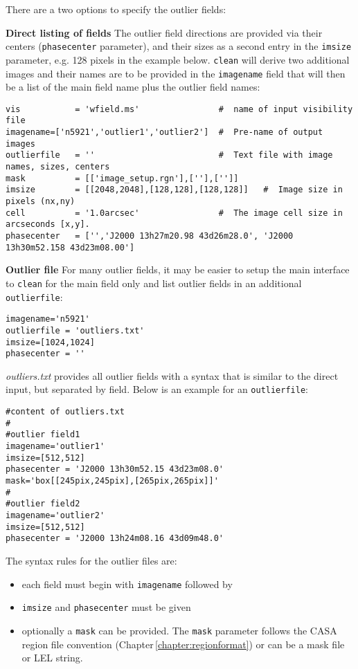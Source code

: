 There are a two options to specify the outlier fields:


{\bf Direct listing of fields} The outlier field directions are
provided via their centers ({\tt phasecenter} parameter), and their
sizes as a second entry in the {\tt imsize} parameter, e.g. 128 pixels
in the example below. {\tt clean} will derive two additional images
and their names are to be provided in the {\tt imagename} field that
will then be a list of the main field name plus the outlier field
names:

\small
\begin{verbatim}
vis           = 'wfield.ms'                #  name of input visibility file
imagename=['n5921','outlier1','outlier2']  #  Pre-name of output images
outlierfile   = ''                         #  Text file with image names, sizes, centers
mask          = [['image_setup.rgn'],[''],['']] 
imsize        = [[2048,2048],[128,128],[128,128]]   #  Image size in pixels (nx,ny)
cell          = '1.0arcsec'                #  The image cell size in arcseconds [x,y].
phasecenter   = ['','J2000 13h27m20.98 43d26m28.0', 'J2000 13h30m52.158 43d23m08.00']
\end{verbatim}
\normalsize

{\bf Outlier file} For many outlier fields, it may be easier to setup
the main interface to {\tt clean} for the main field only and list
outlier fields in an additional {\tt outlierfile}:


\small
\begin{verbatim}
imagename='n5921'
outlierfile = 'outliers.txt'
imsize=[1024,1024]
phasecenter = ''
\end{verbatim}
\normalsize

{\it outliers.txt} provides all outlier fields with a syntax that is
similar to the direct input, but separated by field. Below is an
example for an {\tt outlierfile}:

\small
\begin{verbatim}
#content of outliers.txt
#
#outlier field1
imagename='outlier1'
imsize=[512,512]
phasecenter = 'J2000 13h30m52.15 43d23m08.0'
mask='box[[245pix,245pix],[265pix,265pix]]'
#
#outlier field2
imagename='outlier2'
imsize=[512,512]
phasecenter = 'J2000 13h24m08.16 43d09m48.0'
\end{verbatim}
\normalsize

The syntax rules for the outlier files are:
\begin{itemize}
\item each field must begin with {\tt imagename} followed by 
\item {\tt imsize} and {\tt phasecenter} must be given
\item optionally a {\tt mask} can be provided. The {\tt mask}
  parameter follows the CASA region file convention
  (Chapter\,\ref{chapter:regionformat}) or can be a mask file or LEL
  string.
\end{itemize}


